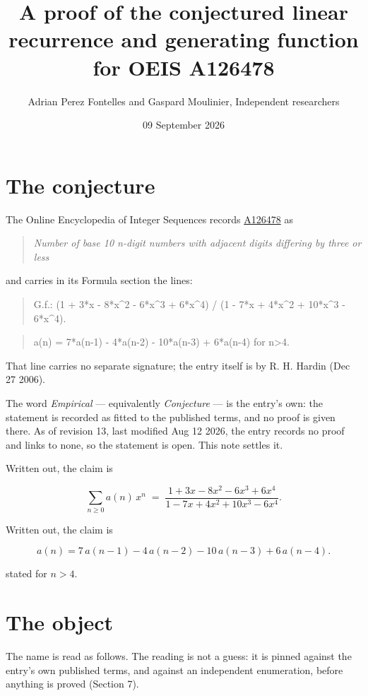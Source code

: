 \documentclass[11pt]{article}
\title{A proof of the conjectured linear recurrence and generating function for OEIS A126478}
\author{Adrian Perez Fontelles and Gaspard Moulinier, Independent researchers}
\date{09 September 2026}
\theoremstyle{definition}
\begin{document}
\maketitle
\section{The conjecture}

The Online Encyclopedia of Integer Sequences records \href{https://oeis.org/A126478}{A126478} as

\begin{quote}\itshape Number of base 10 n-digit numbers with adjacent digits differing by three or less\end{quote}

and carries in its Formula section the lines:

\begin{quote}\ttfamily G.f.: (1 + 3*x - 8*x\textasciicircum{}2 - 6*x\textasciicircum{}3 + 6*x\textasciicircum{}4) / (1 - 7*x + 4*x\textasciicircum{}2 + 10*x\textasciicircum{}3 - 6*x\textasciicircum{}4).\end{quote}

\begin{quote}\ttfamily a(n) = 7*a(n-1) - 4*a(n-2) - 10*a(n-3) + 6*a(n-4) for n>4.\end{quote}

That line carries no separate signature; the entry itself is by R. H. Hardin (Dec 27 2006).

The word {\itshape Empirical} --- equivalently {\itshape Conjecture} --- is the entry's own: the statement is recorded as fitted to the published terms, and no proof is given there. As of revision 13, last modified Aug 12 2026, the entry records no proof and links to none, so the statement is open. This note settles it.

Written out, the claim is

\[\sum_{n \ge 0} a(n)\,x^n \;=\; \frac{1 + 3x - 8x^{2} - 6x^{3} + 6x^{4}}{1 - 7x + 4x^{2} + 10x^{3} - 6x^{4}}.\]

Written out, the claim is

\[a(n) = 7\,a(n-1) - 4\,a(n-2) - 10\,a(n-3) + 6\,a(n-4).\]

stated for $n > 4$.

\section{The object}

The name is read as follows. The reading is not a guess: it is pinned against the entry's own published terms, and against an independent enumeration, before anything is proved (Section 7).
\end{document}
